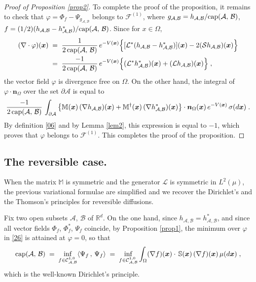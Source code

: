 \documentclass[reqno]{amsart}
\newcounter{as}[section]
\newcommand{\mc}[1]{{\mathcal #1}}
\newcommand{\bb}[1]{{\mathbb #1}}
\newcommand{\bs}[1]{{\boldsymbol #1}}
\newcommand{\<}{\langle}
\renewcommand{\>}{\rangle}
\renewcommand{\Cap}{{\rm cap}}
\begin{document}
\begin{proof}[Proof of Proposition \ref{prop2}]
To complete the proof of the proposition, it remains to check that
$\varphi = \Phi_f - \Psi_{g_{\mc A,\mc B}}$ belongs to $\mathcal F^{(1)}$, where
$g_{\mc A,\mc B} = h_{\mc A,\mc B}/\Cap (\mc A,\,\mc B)$, $f=(1/2) (h_{\mc A,\mc B} - h^*_{\mc A,\mc B})/\Cap
(\mc A,\,\mc B)$. Since for $x\in\Omega$,
\begin{align*}
(\nabla \cdot \varphi)(\bs{x}) \; &=\; \frac 1{2 \, \Cap (\mc A,\,\mc B)}\, e^{-V(\bs{x})}
\Big\{ [\mathcal L^* (h_{\mc A,\mc B} - h^*_{\mc A,\mc B})](\bs{x}) - 2 (\mathcal S h_{\mc A,\mc B})(\bs{x})
\Big\} \\
 &=\; \frac {-1}{2 \, \Cap (\mc A,\,\mc B)}\, e^{-V(\bs{x})}
\Big\{ (\mathcal L^* h^*_{\mc A,\mc B}) (\bs{x}) +  (\mathcal L h_{\mc A,\mc B})(\bs{x}) \Big\}  \;,
\end{align*}
the vector field $\varphi$ is divergence free on $\Omega$. On the
other hand, the integral of $\varphi \cdot \bs n_{\Omega}$ over the set
$\partial \mc A$ is equal to
\begin{equation*}
\frac {-1}{2 \, \Cap (\mc A,\,\mc B)}\, \int_{\partial \mc A}
\big\{ \bb M(\bs{x}) \, (\nabla h_{\mc A,\mc B}) (\bs{x}) + \bb M^\dagger(\bs{x}) \,
(\nabla h^*_{\mc A,\mc B}) (\bs{x}) \big\}
\cdot \bs n_{\Omega}(\bs{x}) \, e^{-V(\bs{x})} \, \sigma(d\bs{x}) \;.
\end{equation*}
By definition \eqref{06} and by Lemma \ref{lem2}, this expression is
equal to $-1$, which proves that $\varphi$ belongs to $\mathcal
F^{(1)}$. This completes the proof of the proposition.
\end{proof}

\subsection{The reversible case.}

When the matrix $\bb M$ is symmetric and the generator $\mathcal L$ is
symmetric in $L^2(\mu)$, the previous variational formulae are
simplified and we recover the Dirichlet's and the Thomson's principles for
reversible diffusions.

Fix two open subsets $\mc A$, $\mc B$ of $\bb R^d$.  On the one hand, since
$h_{\mc A,\mc B} = h^*_{\mc A,\mc B}$, and since all vector fields $\Phi_f$,
$\Phi^*_f$, $\Psi_f$ coincide, by Proposition \ref{prop1}, the minimum
over $\varphi$ in \eqref{26} is attained at $\varphi=0$, so that
\begin{equation}
\label{27}
\Cap (\mc A,\,\mc B) \;=\; \inf_{f\in \mathcal C^{1,0}_{\mc A,\mc B}}
\< \Psi_f  \,,\, \Psi_f \> \;=\; \inf_{f\in \mathcal C^{1,0}_{\mc A,\mc B}}
\int_{\Omega} (\nabla f)(\bs{x}) \cdot
\, \bb S (\bs{x}) \, (\nabla f)(\bs{x}) \, \mu(d\bs{x})\;,
\end{equation}
which is the well-known Dirichlet's principle.
\end{document}
